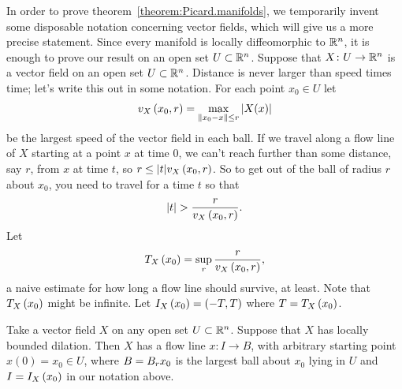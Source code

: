 \begingroup
\newcommand*{\mxsp}[3]{\ensuremath{v_{#1}\of{#2,#3}}}
\newcommand*{\mxt}[2]{\ensuremath{T_{#1}\of{#2}}}
\newcommand*{\intr}[2]{\ensuremath{I_{#1}\of{#2}}}
In order to prove theorem~\vref{theorem:Picard.manifolds}, we temporarily invent some disposable notation concerning vector fields, which will give us a more precise statement.
Since every manifold is locally diffeomorphic to \(\mathbb{R}^{n}\), it is enough to prove our result on an open set \(U \subset \mathbb{R}^{n}\).
Suppose that \(X \colon U \to \mathbb{R}^{n}\) is a vector field on an open set \(U \subset \mathbb{R}^{n}\).
Distance is never larger than speed times time; let's write this out in some notation.
For each point \(x_0 \in U\) let 
\[
\mxsp{X}{x_0}{r} = \max_{\norm{x_0-x}\le r} \left|X(x)\right|
\]
be the largest speed of the vector field in each ball.
If we travel along a flow line of \(X\) starting at a point \(x\) at time \(0\), we can't reach further than some distance, say \(r\), from \(x\) at time \(t\), so \(r \le |t| \mxsp{X}{x_0}{r}\).
So to get out of the ball of radius \(r\) about \(x_0\), you need to travel for a time \(t\) so that 
\[
|t| > \frac{r}{\mxsp{X}{x_0}{r}}.
\]
Let
\[
\mxt{X}{x_0}=\sup_r \frac{r}{\mxsp{X}{x_0}{r}},
\]
a naive estimate for how long a flow line should survive, at least.
Note that \(\mxt{X}{x_0}\) might be infinite. 
Let \(\intr{X}{x_0}=\pr{-T,T}\) where \(T=\mxt{X}{x_0}\).
\begin{theorem}\label{theorem:exist.unique}
Take a vector field \(X\) on any open set \(U \subset \mathbb{R}^{n}\).
Suppose that \(X\) has locally bounded dilation.
Then \(X\) has a flow line \(x \colon I \to B\), with arbitrary starting point \(x(0)=x_0 \in U\), where \(B=\ball{r}{x_0}\) is the largest ball about \(x_0\) lying in \(U\) and \(I=\intr{X}{x_0}\) in our notation above.
\end{theorem}
